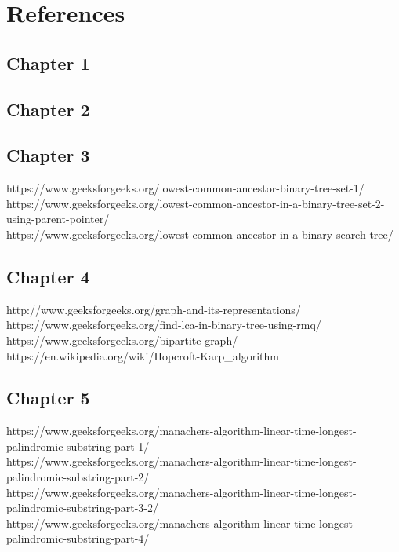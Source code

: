 \section{References}


\subsection{Chapter 1}

\subsection{Chapter 2}


\subsection{Chapter 3}
https://www.geeksforgeeks.org/lowest-common-ancestor-binary-tree-set-1/ \\
https://www.geeksforgeeks.org/lowest-common-ancestor-in-a-binary-tree-set-2-using-parent-pointer/ \\
https://www.geeksforgeeks.org/lowest-common-ancestor-in-a-binary-search-tree/ \\


\subsection{Chapter 4}
http://www.geeksforgeeks.org/graph-and-its-representations/ \\
https://www.geeksforgeeks.org/find-lca-in-binary-tree-using-rmq/ \\
https://www.geeksforgeeks.org/bipartite-graph/ \\
https://en.wikipedia.org/wiki/Hopcroft-Karp\_algorithm \\


\subsection{Chapter 5}
https://www.geeksforgeeks.org/manachers-algorithm-linear-time-longest-palindromic-substring-part-1/ \\
https://www.geeksforgeeks.org/manachers-algorithm-linear-time-longest-palindromic-substring-part-2/ \\
https://www.geeksforgeeks.org/manachers-algorithm-linear-time-longest-palindromic-substring-part-3-2/ \\
https://www.geeksforgeeks.org/manachers-algorithm-linear-time-longest-palindromic-substring-part-4/ \\


